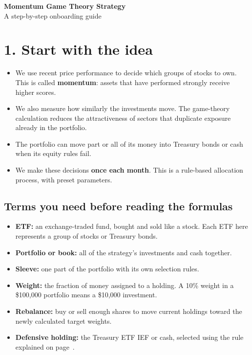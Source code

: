 \documentclass[11pt,letterpaper]{article}
\newcommand{\topic}[1]{\Needspace{5\baselineskip}\subsection*{#1}}
\begin{document}
\begin{center}
{\LARGE\bfseries Momentum Game Theory Strategy}\\[4pt]
{\large A step-by-step onboarding guide}
\end{center}

\section*{1. Start with the idea}
\begin{itemize}
\item We use recent price performance to decide which groups of stocks to own. This is called \textbf{momentum}: assets that have performed strongly receive higher scores.
\item We also measure how similarly the investments move. The game-theory calculation reduces the attractiveness of sectors that duplicate exposure already in the portfolio.
\item The portfolio can move part or all of its money into Treasury bonds or cash when its equity rules fail.
\item We make these decisions \textbf{once each month}. This is a rule-based allocation process, with preset parameters.
\end{itemize}

\topic{Terms you need before reading the formulas}
\begin{itemize}
\item \textbf{ETF:} an exchange-traded fund, bought and sold like a stock. Each ETF here represents a group of stocks or Treasury bonds.
\item \textbf{Portfolio or book:} all of the strategy's investments and cash together.
\item \textbf{Sleeve:} one part of the portfolio with its own selection rules.
\item \textbf{Weight:} the fraction of money assigned to a holding. A 10\% weight in a \$100,000 portfolio means a \$10,000 investment.
\item \textbf{Rebalance:} buy or sell enough shares to move current holdings toward the newly calculated target weights.
\item \textbf{Defensive holding:} the Treasury ETF IEF or cash, selected using the rule explained on page~\pageref{style-rules}.
\end{itemize}
\end{document}
